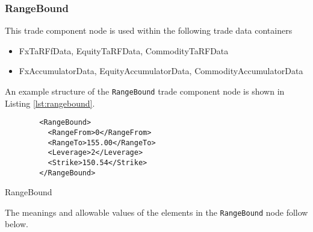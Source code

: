 \subsubsection{RangeBound}
\label{ss:rangebound}
This trade component node is used within the following trade data containers

\begin{itemize}
  \item FxTaRFfData, EquityTaRFData, CommodityTaRFData
  \item FxAccumulatorData, EquityAccumulatorData, CommodityAccumulatorData
\end{itemize}

An example structure of the \lstinline!RangeBound! trade component node is shown in Listing
\ref{lst:rangebound}.

\begin{listing}[H]
\begin{verbatim}
        <RangeBound>
          <RangeFrom>0</RangeFrom>
          <RangeTo>155.00</RangeTo>
          <Leverage>2</Leverage>
          <Strike>150.54</Strike>
        </RangeBound>
\end{verbatim}
\caption{RangeBound}
\label{lst:rangebound}
\end{listing}

The meanings and allowable values of the elements in the \lstinline!RangeBound! node follow below.


